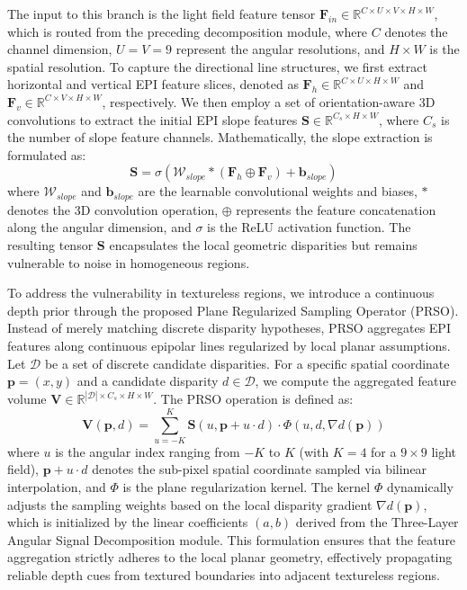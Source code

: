\documentclass[lettersize,journal]{IEEEtran}
\begin{document}
The input to this branch is the light field feature tensor $\mathbf{F}_{in} \in \mathbb{R}^{C \times U \times V \times H \times W}$, which is routed from the preceding decomposition module, where $C$ denotes the channel dimension, $U=V=9$ represent the angular resolutions, and $H \times W$ is the spatial resolution. To capture the directional line structures, we first extract horizontal and vertical EPI feature slices, denoted as $\mathbf{F}_{h} \in \mathbb{R}^{C \times U \times H \times W}$ and $\mathbf{F}_{v} \in \mathbb{R}^{C \times V \times H \times W}$, respectively. We then employ a set of orientation-aware 3D convolutions to extract the initial EPI slope features $\mathbf{S} \in \mathbb{R}^{C_s \times H \times W}$, where $C_s$ is the number of slope feature channels. Mathematically, the slope extraction is formulated as:
\begin{equation}
\mathbf{S} = \sigma \left( \mathcal{W}_{slope} * (\mathbf{F}_{h} \oplus \mathbf{F}_{v}) + \mathbf{b}_{slope} \right)
\label{eq:ch3_8}
\end{equation}
where $\mathcal{W}_{slope}$ and $\mathbf{b}_{slope}$ are the learnable convolutional weights and biases, $*$ denotes the 3D convolution operation, $\oplus$ represents the feature concatenation along the angular dimension, and $\sigma$ is the ReLU activation function. The resulting tensor $\mathbf{S}$ encapsulates the local geometric disparities but remains vulnerable to noise in homogeneous regions.

To address the vulnerability in textureless regions, we introduce a continuous depth prior through the proposed Plane Regularized Sampling Operator (PRSO). Instead of merely matching discrete disparity hypotheses, PRSO aggregates EPI features along continuous epipolar lines regularized by local planar assumptions. Let $\mathcal{D}$ be a set of discrete candidate disparities. For a specific spatial coordinate $\mathbf{p} = (x,y)$ and a candidate disparity $d \in \mathcal{D}$, we compute the aggregated feature volume $\mathbf{V} \in \mathbb{R}^{|\mathcal{D}| \times C_s \times H \times W}$. The PRSO operation is defined as:
\begin{equation}
\mathbf{V}(\mathbf{p}, d) = \sum_{u=-K}^{K} \mathbf{S}(u, \mathbf{p} + u \cdot d) \cdot \Phi(u, d, \nabla d(\mathbf{p}))
\label{eq:ch3_9}
\end{equation}
where $u$ is the angular index ranging from $-K$ to $K$ (with $K=4$ for a $9 \times 9$ light field), $\mathbf{p} + u \cdot d$ denotes the sub-pixel spatial coordinate sampled via bilinear interpolation, and $\Phi$ is the plane regularization kernel. The kernel $\Phi$ dynamically adjusts the sampling weights based on the local disparity gradient $\nabla d(\mathbf{p})$, which is initialized by the linear coefficients $(a, b)$ derived from the Three-Layer Angular Signal Decomposition module. This formulation ensures that the feature aggregation strictly adheres to the local planar geometry, effectively propagating reliable depth cues from textured boundaries into adjacent textureless regions.
\end{document}
